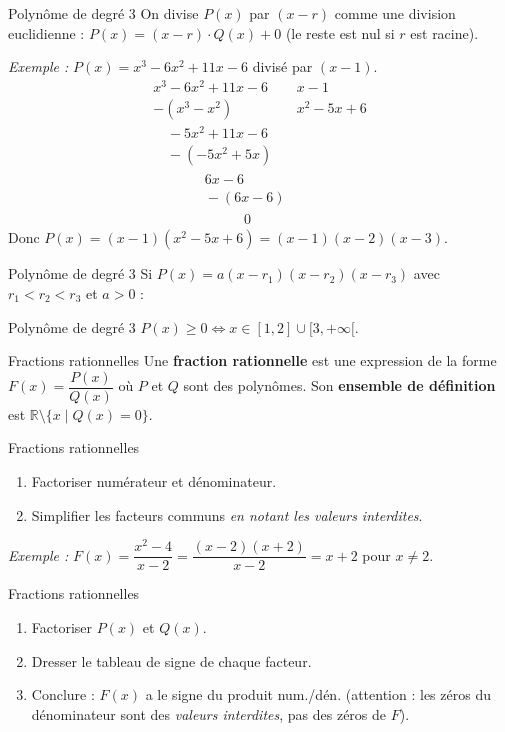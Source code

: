 \documentclass[aspectratio=169,10pt]{beamer}
\begin{document}
\begin{frame}{Polynôme de degré 3}
On divise \(P(x)\) par \((x-r)\) comme une division euclidienne :
\(P(x) = (x-r)\cdot Q(x) + 0\) (le reste est nul si \(r\) est racine).

\emph{Exemple :} \(P(x) = x^3 - 6x^2 + 11x - 6\) divisé par \((x-1)\).
\[
\begin{array}{r|l}
x^3-6x^2+11x-6 & x-1\\

-(x^3-x^2) & x^2-5x+6\\

\phantom{x^3{}}-5x^2+11x-6 & \\
\phantom{x^3{}}-(-5x^2+5x) & \\

\phantom{x^3-6x^2{}}6x-6 & \\
\phantom{x^3-6x^2{}}-(6x-6) & \\

\phantom{x^3-6x^2+11x{}}0 &
\end{array}
\]
Donc \(P(x) = (x-1)(x^2-5x+6) = (x-1)(x-2)(x-3)\).
\end{frame}
\begin{frame}{Polynôme de degré 3}
Si \(P(x) = a(x-r_1)(x-r_2)(x-r_3)\) avec \(r_1 < r_2 < r_3\) et \(a>0\) :
\end{frame}
\begin{frame}{Polynôme de degré 3}
\(P(x) \geq 0 \Leftrightarrow x \in [1,2]\cup[3,+\infty[\).
\end{frame}
\begin{frame}{Fractions rationnelles}
Une \textbf{fraction rationnelle} est une expression de la forme
\(F(x) = \dfrac{P(x)}{Q(x)}\) où \(P\) et \(Q\) sont des polynômes.
Son \textbf{ensemble de définition} est \(\mathbb{R} \setminus \{x \mid Q(x)=0\}\).
\end{frame}
\begin{frame}{Fractions rationnelles}
\begin{enumerate}
\setcounter{enumi}{0}
  \item Factoriser numérateur et dénominateur.
  
\item Simplifier les facteurs communs \emph{en notant les valeurs interdites}.

\end{enumerate}

\emph{Exemple :} \(F(x) = \dfrac{x^2-4}{x-2} = \dfrac{(x-2)(x+2)}{x-2} = x+2\)
pour \(x \ne 2\).
\end{frame}
\begin{frame}{Fractions rationnelles}
\begin{enumerate}
\setcounter{enumi}{0}
  \item Factoriser \(P(x)\) et \(Q(x)\).
  
\item Dresser le tableau de signe de chaque facteur.
  
\item Conclure : \(F(x)\) a le signe du produit num./dén.
        (attention : les zéros du dénominateur sont des \emph{valeurs interdites},
        pas des zéros de \(F\)).

\end{enumerate}
\end{frame}
\end{document}
